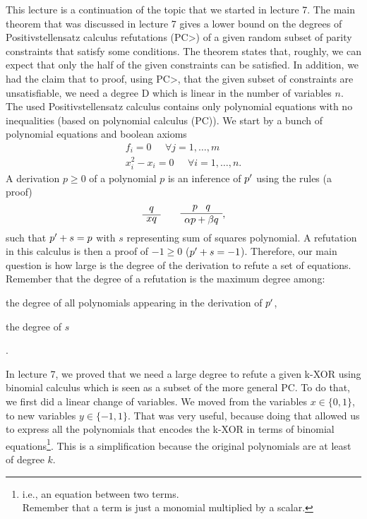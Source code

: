 \documentclass[a4paper,twoside,justified]{tufte-handout}
\begin{document}
 

This lecture is a continuation of the topic that we started in lecture 7. The main theorem that was discussed in lecture 7 gives a lower bound on the degrees of Positivstellensatz calculus refutations\cite{grigoriev2001linear} (PC>) of a given random subset of parity constraints that satisfy some conditions. The theorem states that, roughly, we can expect that only the half of the given constraints can be satisfied. In addition, we had the claim that to proof, using PC>, that the given subset of constraints are unsatisfiable, we need a degree D which is linear in the number of variables $n$. The used Positivstellensatz calculus contains only polynomial equations with no inequalities (based on polynomial calculus (PC)). 
We start by a bunch of polynomial equations and boolean axioms
\begin{align*}
f_i = 0 \;\;\;\;\; \forall j = 1, \dots, m\\
x_i^2 - x_i = 0\;\;\;\;\; \forall i = 1, \dots, n.
\end{align*}
A derivation $p \geq 0$ of a polynomial $p$ is an inference of $p\rq{}$ using the rules (a proof)
\begin{equation*}
\AxiomC{$q$}
\UnaryInfC{$xq$}
\DisplayProof
\qquad
\AxiomC{$p \; \;  \;q$}
\UnaryInfC{$\alpha p+ \beta q$}
\DisplayProof,
\end{equation*}
such that $p\rq{}+s =p$ with $s$ representing sum of squares polynomial. A refutation in this calculus is then a proof of $ -1 \geq 0$ ($p\rq{}+s = -1$).
Therefore, our main question  is how large is the degree of the derivation to refute a set of equations. Remember that the degree of a refutation is the maximum degree among:
\begin{inparaenum}[(i)]
 \item the degree of all polynomials appearing in the derivation of $p\rq{}$,
 \item the degree of $s$
\end{inparaenum}.

In lecture 7, we proved that we need a large degree to refute a given k-XOR using binomial calculus which is seen as a subset of the more general PC. To do that, we first did a linear change of variables. We moved from the variables $x \in \{0,1\}$, to new variables $y \in \{-1,1\}$. That was very useful, because doing that allowed us to express all the polynomials that encodes the k-XOR in terms of binomial equations\footnote{i.e., an equation between two terms.\\ Remember that a term is just a monomial multiplied by a scalar.}. This is a simplification because the original polynomials are at least of degree $k$.
\end{document}
